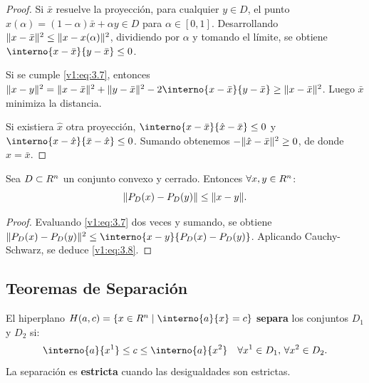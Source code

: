 \begin{proof}
 Si $\bar{x}$ resuelve la proyección, para cualquier $y \in D$, el punto $x(\alpha) = (1 - \alpha)\bar{x} + \alpha y \in D$ para $\alpha \in [0, 1]$. Desarrollando $\lVert x - \bar{x}\rVert^2 \leq \lVert x - x(\alpha)\rVert^2$, dividiendo por $\alpha$ y tomando el límite, se obtiene $\interno{x - \bar{x}}{y - \bar{x}} \leq 0$.
 
 Si se cumple \eqref{v1:eq:3.7}, entonces $\norm{x - y}^2 = \norm{x - \bar{x}}^2 + \norm{y - \bar{x}}^2 - 2\interno{x - \bar{x}}{y - \bar{x}} \ge \norm{x - \bar{x}}^2$. Luego $\bar{x}$ minimiza la distancia.
 
 Si existiera $\hat{x}$ otra proyección, $\interno{x - \bar{x}}{\hat{x} - \bar{x}} \leq 0$ y $\interno{x - \hat{x}}{\bar{x} - \hat{x}} \leq 0$. Sumando obtenemos $-\lVert\hat{x} - \bar{x}\rVert^2 \ge 0$, de donde $\hat{x} = \bar{x}$.
\end{proof}

\begin{corollary}\label{v1:cor:3.2.3}
 Sea $D \subset R^n$ un conjunto convexo y cerrado. Entonces $\forall x, y \in R^n$:
 \begin{equation}
 \lVert P_D(x) - P_D(y)\rVert \leq \lVert x - y\rVert. \label{v1:eq:3.8}
 \end{equation}
\end{corollary}

\begin{proof}
 Evaluando \eqref{v1:eq:3.7} dos veces y sumando, se obtiene $\norm{P_D(x) - P_D(y)}^2 \le \interno{x - y}{P_D(x) - P_D(y)}$. Aplicando Cauchy-Schwarz, se deduce \eqref{v1:eq:3.8}.
\end{proof}

\subsection{Teoremas de Separación}

\begin{definition}\label{v1:def:3.2.6}
 El hiperplano $H(a, c) = \{ x \in \Rn \mid \interno{a}{x} = c \}$ \textbf{separa} los conjuntos $D_1$ y $D_2$ si:
 \[
 \interno{a}{x^1} \leq c \leq \interno{a}{x^2} \quad \forall x^1 \in D_1, \, \forall x^2 \in D_2.
 \]
 La separación es \textbf{estricta} cuando las desigualdades son estrictas.
\end{definition}

